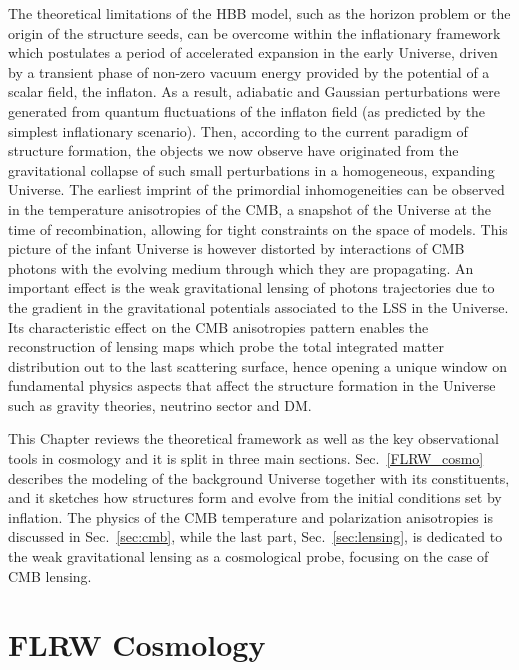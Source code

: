 The theoretical limitations of the \gls{HBB} model, such as the horizon problem or the origin of the
structure seeds, can be overcome within the inflationary framework which postulates a period of 
accelerated expansion in the early Universe, driven by a transient phase of non-zero vacuum energy provided by the potential of a scalar field, the inflaton. As a result, adiabatic and Gaussian perturbations were generated from quantum fluctuations of the inflaton field (as predicted by the simplest inflationary 
scenario).
Then, according to the current paradigm of structure formation, the objects we now observe have
originated from the gravitational collapse of such small perturbations in a homogeneous, expanding 
Universe. The earliest imprint of the primordial inhomogeneities can be observed in the temperature anisotropies of the \gls{CMB}, a snapshot of the Universe at the time of recombination, allowing for 
tight constraints on the space of models. 
This picture of the infant Universe is however distorted by interactions of \gls{CMB} photons with the 
evolving medium through which they are propagating. An important effect is the weak gravitational lensing
of photons trajectories due to the gradient in the gravitational potentials associated to the \gls{LSS} in 
the Universe. Its characteristic effect on the \gls{CMB} anisotropies pattern enables the reconstruction of
lensing maps which probe the total integrated matter distribution out to the last scattering surface, hence
opening a unique window on fundamental physics aspects that affect the structure formation in the 
Universe such as gravity theories, neutrino sector and \gls{DM}.

This Chapter reviews the theoretical framework as well as the key observational tools in cosmology and it
is split in three main sections. Sec.~\eqref{FLRW_cosmo} describes the modeling of the 
background Universe together with its constituents, and it sketches how structures form and evolve 
from the initial conditions set by inflation. The physics of the \gls{CMB} temperature and polarization 
anisotropies is discussed in Sec.~\eqref{sec:cmb}, while the last part, Sec.~\eqref{sec:lensing}, is dedicated to 
the weak gravitational lensing as a cosmological probe, focusing on the case of \gls{CMB} lensing.



\section{FLRW Cosmology}
\label{FLRW_cosmo}

